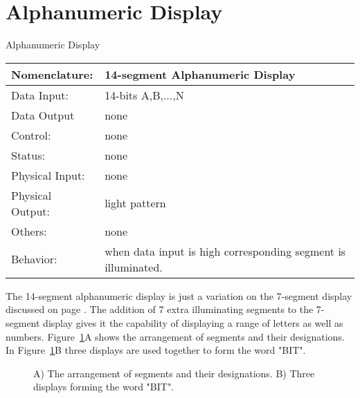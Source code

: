                     \section{Alphanumeric Display}
                        \label{page:alpha}
                        \begin{buildingblock}{Alphanumeric Display }
                            \begin{tabular}{|l|p{3.5in}|} \hline
                                Nomenclature:  & 14-segment Alphanumeric Display  \\ \hline
                                Data Input:    & 14-bits A,B,...,N     \\ \hline
                                Data Output    & none    \\ \hline
                                Control:       & none           \\ \hline
                                Status:        & none                                   \\ \hline
                                Physical Input:& none        \\ \hline
                                Physical Output:& light pattern        \\ \hline
                                Others:        & none                   \\ \hline
                                Behavior:      & when data input is high corresponding segment
                                is illuminated. \\ \hline
                            \end{tabular}
                        \end{buildingblock}

                        The 14-segment alphanumeric display is just a variation on the
                        7-segment display discussed on page \pageref{page:7seg}.  The addition
                        of 7 extra illuminating segments to the 7-segment display gives
                        it the capability of displaying a range of letters as well as
                        numbers.  Figure~\ref{fig:commonPeripheralComponentsalpha}A shows the arrangement of segments
                        and their designations.  In Figure~\ref{fig:commonPeripheralComponentsalpha}B three displays
                        are used together to form the word "BIT".

                        \begin{figure}[ht]
                        \caption{A) The arrangement of segments and their designations.  B) Three
                    displays forming the word "BIT".}
                    \label{fig:commonPeripheralComponentsalpha}
                \end{figure}

